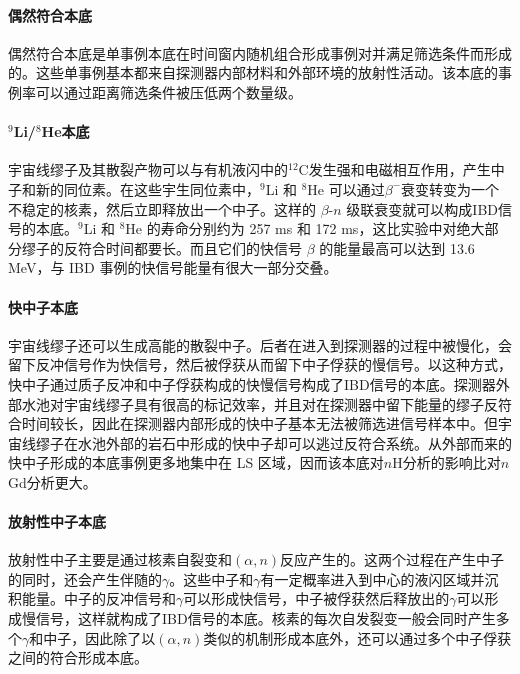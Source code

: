 \documentclass[a4paper,zihao=-4]{article}
\begin{document}
\paragraph{偶然符合本底}

偶然符合本底是单事例本底在时间窗内随机组合形成事例对并满足筛选条件而形成的。这些单事例基本都来自探测器内部材料和外部环境的放射性活动。该本底的事例率可以通过距离筛选条件被压低两个数量级。

\paragraph{$^9$Li/$^8$He本底}宇宙线缪子及其散裂产物可以与有机液闪中的$^{12}$C发生强和电磁相互作用，产生中子和新的同位素。在这些宇生同位素中，$^9$Li 和 $^8$He 可以通过$\beta^-$衰变转变为一个不稳定的核素，然后立即释放出一个中子。这样的 $\beta$-$n$ 级联衰变就可以构成IBD信号的本底。$^9$Li 和 $^8$He 的寿命分别约为 257 ms 和 172 ms，这比实验中对绝大部分缪子的反符合时间都要长。而且它们的快信号 $\beta$ 的能量最高可以达到 13.6 MeV，与 IBD 事例的快信号能量有很大一部分交叠。
\paragraph{快中子本底}宇宙线缪子还可以生成高能的散裂中子。后者在进入到探测器的过程中被慢化，会留下反冲信号作为快信号，然后被俘获从而留下中子俘获的慢信号。以这种方式，快中子通过质子反冲和中子俘获构成的快慢信号构成了IBD信号的本底。探测器外部水池对宇宙线缪子具有很高的标记效率，并且对在探测器中留下能量的缪子反符合时间较长，因此在探测器内部形成的快中子基本无法被筛选进信号样本中。但宇宙线缪子在水池外部的岩石中形成的快中子却可以逃过反符合系统。从外部而来的快中子形成的本底事例更多地集中在 LS 区域，因而该本底对$n$H分析的影响比对$n$Gd分析更大。
\paragraph{}
\paragraph{放射性中子本底}
放射性中子主要是通过核素自裂变和$(\alpha,n)$反应产生的。这两个过程在产生中子的同时，还会产生伴随的$\gamma$。这些中子和$\gamma$有一定概率进入到中心的液闪区域并沉积能量。中子的反冲信号和$\gamma$可以形成快信号，中子被俘获然后释放出的$\gamma$可以形成慢信号，这样就构成了IBD信号的本底。核素的每次自发裂变一般会同时产生多个$\gamma$和中子，因此除了以$(\alpha,n)$类似的机制形成本底外，还可以通过多个中子俘获之间的符合形成本底。
\end{document}

